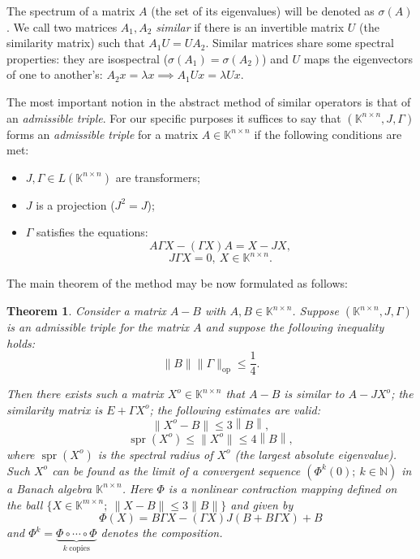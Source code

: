 \documentclass[a4paper]{jpconf}
\newtheorem{nkjpcsthm}{Theorem}
\begin{document}
The spectrum of a matrix \( A \)
    (the set of its eigenvalues)
    will be denoted as \( \sigma(A) \).
We call two matrices \( A_1, A_2 \) \emph{similar}
    if there is an invertible matrix \( U \)
    (the similarity matrix)
    such that \( A_1 U = U A_2 \).
Similar matrices share some spectral properties:
    they are isospectral (\( \sigma(A_1) = \sigma(A_2) \))
    and \( U \) maps the eigenvectors of one to another's:
    \( A_2 x = \lambda x \implies A_1 U x = \lambda U x \).

The most important notion
    in the abstract method of similar operators
    is that of an \emph{admissible triple}.
For our specific purposes it suffices to say
    that \( (\mathbb{K}^{n{\times}n}, J, \Gamma) \)
    forms an \emph{admissible triple}
    for a matrix \( A\in\mathbb{K}^{n{\times}n} \)
    if the following conditions are met:
\begin{itemize}
    \item \( J, \Gamma \in L(\mathbb{K}^{n{\times}n}) \)
        are transformers;
    \item \( J \) is a projection (\( J^2 = J \));
    \item  \( \Gamma \) satisfies the equations:
        \[
            A \Gamma X - (\Gamma X) A = X - JX,
        \]
        \[
            J\Gamma X = 0,\ X\in\mathbb{K}^{n{\times}n}.
        \]
\end{itemize}

The main theorem of the method
    may be now formulated as follows:

\begin{nkjpcsthm}
    Consider a matrix \( A - B \)
        with \( A, B \in \mathbb{K}^{n{\times}n} \).
    Suppose \( (\mathbb{K}^{n{\times}n}, J, \Gamma) \)
        is an admissible triple for the matrix \( A \)
        and suppose the following inequality holds:
        \[
            \|B\|\|\Gamma\|_{\mathrm{op}} \leq \frac14.
        \]

    Then there exists such a matrix \( X^o\in\mathbb{K}^{n{\times}n} \)
        that \( A - B \) is similar to \( A - J X^o \);
        the similarity matrix is \( E + \Gamma X^o \);
        the following estimates are valid:
        \[
            \|X^o - B\| \leq 3 \left\|B\right\|,
        \]
        \[
            \operatorname{spr}(X^o) \leq \|X^o\| \leq 4 \left\|B\right\|,
        \]
        where \( \operatorname{spr}(X^o) \)
        is the spectral radius of \( X^o \) (the largest absolute eigenvalue).
    Such \( X^o \) can be found as the limit of a convergent sequence
        \( \left( \Phi^k(0);\ k\in\mathbb{N} \right) \)
        in a Banach algebra \( \mathbb{K}^{n{\times}n} \).
        Here \( \Phi \) is a nonlinear contraction mapping
        defined on the ball \( \{X\in\mathbb{K}^{m{\times}n};\ \|X-B\|\leq 3\|B\| \} \)
        and given by
    \[
        \Phi(X) = B\Gamma X - (\Gamma X)J(B + B\Gamma X) + B
    \]
        and \( \Phi^k = \underbrace{\Phi\circ\cdots\circ\Phi}_{k\ \text{copies}} \)
        denotes the composition.
\end{nkjpcsthm}
\end{document}
